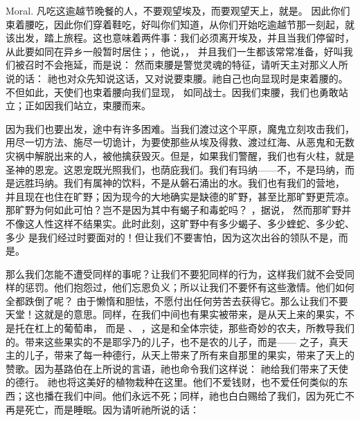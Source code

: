 Moral. 凡吃这逾越节晚餐的人，不要观望埃及，而要观望天上，就是。 因此你们束着腰吃，因此你们穿着鞋吃，好叫你们知道，从你们开始吃逾越节那一刻起，就该出发，踏上旅程。这也意味着两件事：我们必须离开埃及，并且当我们停留时，从此要如同在异乡一般暂时居住；，他说，， 并且我们一生都该常常准备，好叫我们被召时不会拖延，而是说：  然而束腰是警觉灵魂的特征，请听天主对那义人所说的话： 祂也对众先知说这话，又对说要束腰。祂自己也向显现时是束着腰的。 不但如此，天使们也束着腰向我们显现， 如同战士。因我们束腰，我们也勇敢站立；正如因我们站立，束腰而来。\par

因为我们也要出发，途中有许多困难。当我们渡过这个平原，魔鬼立刻攻击我们，用尽一切方法、施尽一切诡计，为要使那些从埃及得救、渡过红海、从恶鬼和无数灾祸中解脱出来的人，被他擒获毁灭。但是，如果我们警醒，我们也有火柱，就是圣神的恩宠。这恩宠既光照我们，也荫庇我们。我们有玛纳——不，不是玛纳，而是远胜玛纳。我们有属神的饮料，不是从磐石涌出的水。我们也有我们的营地， 并且现在也住在旷野；因为现今的大地确实是缺德的旷野，甚至比那旷野更荒凉。那旷野为何如此可怕？岂不是因为其中有蝎子和毒蛇吗？ ，据说， 然而那旷野并不像这人性这样不结果实。此时此刻，这旷野中有多少蝎子、多少蝰蛇、多少蛇、多少 是我们经过时要面对的！但让我们不要害怕，因为这次出谷的领队不是，而是。\par

那么我们怎能不遭受同样的事呢？让我们不要犯同样的行为，这样我们就不会受同样的惩罚。他们抱怨过，他们忘恩负义；所以让我们不要怀有这些激情。他们如何全都跌倒了呢？  由于懒惰和胆怯，不愿付出任何劳苦去获得它。那么让我们不要天堂！这就是的意思。同样，在我们中间也有果实被带来，是从天上来的果实，不是托在杠上的葡萄串， 而是 、 ，这是和全体宗徒，那些奇妙的农夫，所教导我们的。带来这些果实的不是耶孚乃的儿子，也不是农的儿子，而是—— 之子，真天主的儿子，带来了每一种德行，从天上带来了所有来自那里的果实，带来了天上的赞歌。因为基路伯在上所说的言语，祂也命令我们这样说： 祂给我们带来了天使的德行。 祂也将这美好的植物栽种在这里。他们不爱钱财，也不爱任何类似的东西；这也播在我们中间。他们永远不死；同样，祂也白白赐给了我们，因为死亡不再是死亡，而是睡眠。因为请听祂所说的话：\par

